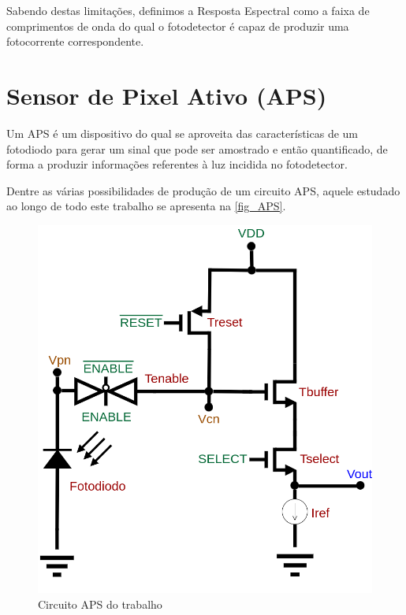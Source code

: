 Sabendo destas limitações, definimos a Resposta Espectral como a faixa de comprimentos de onda do qual o fotodetector \'e capaz de produzir uma fotocorrente correspondente.

\section{Sensor de Pixel Ativo (APS)}
\label{section:APS}
Um APS \'e um dispositivo do qual se aproveita das características de um fotodiodo para gerar um sinal que pode ser amostrado e então quantificado, de forma a produzir informações referentes à luz incidida no fotodetector.

Dentre as várias possibilidades de produção de um circuito APS, aquele estudado ao longo de todo este trabalho se apresenta na \autoref{fig_APS}.

\begin{figure}[!h]
	\caption{\label{fig_APS}Circuito APS do trabalho}
	\begin{center}
	    \includegraphics[scale=0.3]{Circuitos/APS.png}
	\end{center}
\end{figure}

